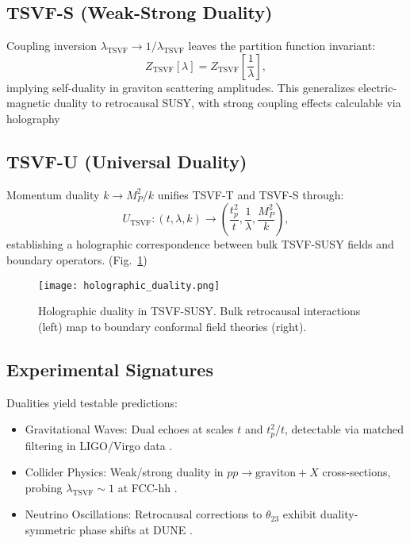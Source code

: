 \documentclass[twocolumn,superscriptaddress,floatfix]{revtex4-2}
\begin{document}
\subsection{TSVF-S (Weak-Strong Duality)}  
\label{subsec:s_duality}  

Coupling inversion \( \lambda_{\text{TSVF}} \to 1/\lambda_{\text{TSVF}} \) leaves the partition function invariant:  
\begin{equation}  
Z_{\text{TSVF}}[\lambda] = Z_{\text{TSVF}}\!\left[\frac{1}{\lambda}\right],  
\label{eq:s_duality}  
\end{equation}  
implying self-duality in graviton scattering amplitudes. This generalizes electric-magnetic duality \cite{Montonen1977} to retrocausal SUSY, with strong coupling effects calculable via holography

\subsection{TSVF-U (Universal Duality)}  
\label{subsec:u_duality}  

Momentum duality $k \to M_P^2/k$ unifies TSVF-T and TSVF-S through:
\begin{equation}
U_{\text{TSVF}}: (t, \lambda, k) \rightarrow \left(\frac{t_p^2}{t}, \frac{1}{\lambda}, \frac{M_P^2}{k}\right),
\end{equation}
establishing a holographic correspondence between bulk TSVF-SUSY fields and boundary operators.  (Fig.~\ref{fig:holography})

\begin{figure}[htbp]  
\centering  
\texttt{[image: holographic\_duality.png]}  
\caption{Holographic duality in TSVF-SUSY. Bulk retrocausal interactions (left) map to boundary conformal field theories (right).}  
\label{fig:holography}  
\end{figure}  

\subsection{Experimental Signatures}  
\label{subsec:duality_signatures}  

Dualities yield testable predictions:
\begin{itemize}
\item Gravitational Waves: Dual echoes at scales $t$ and $t_p^2/t$, detectable via matched filtering in LIGO/Virgo data \cite{LSC2021}.
\item Collider Physics: Weak/strong duality in $pp \to \text{graviton} + X$ cross-sections, probing $\lambda_{\text{TSVF}} \sim 1$ at FCC-hh \cite{Abada2019}.
\item Neutrino Oscillations: Retrocausal corrections to $\theta_{23}$ exhibit duality-symmetric phase shifts at DUNE \cite{Abi2021}.
\end{itemize}
\end{document}
